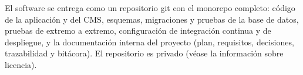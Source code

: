 El software se entrega como un repositorio git con el monorepo completo:
código de la aplicación y del CMS, esquemas, migraciones y pruebas de la base
de datos, pruebas de extremo a extremo, configuración de integración continua
y de despliegue, y la documentación interna del proyecto (plan, requisitos,
decisiones, trazabilidad y bitácora). El repositorio es privado (véase la información sobre
licencia).
